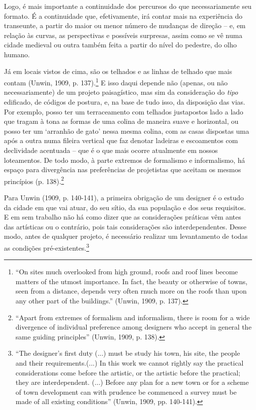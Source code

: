 \documentclass[12pt, a4paper]{book} %
\begin{document}
        Logo, é mais importante a continuidade dos percursos do que necessariamente seu formato. É a continuidade que, efetivamente, irá contar mais na experiência do transeunte, a partir do maior ou menor número de mudanças de direção – e, em relação às curvas, as perspectivas e possíveis surpresas, assim como se vê numa cidade medieval ou outra também feita a partir do nível do pedestre, do olho humano.

        Já em locais vistos de cima, são os telhados e as linhas de telhado que mais contam (Unwin, 1909, p. 137).\footnote[26]{``On sites much overlooked from high ground, roofs and roof lines become matters of the utmost importance. In fact, the beauty or otherwise of towns, seen from a distance, depends very often rnuch more on the roofs than upon any other part of the buildings.'' (Unwin, 1909, p. 137).} E isso daqui depende não (apenas, ou não necessariamente) de um projeto paisagístico, mas sim da consideração do \textit{tipo} edificado, de códigos de postura, e, na base de tudo isso, da disposição das vias. Por exemplo, posso ter um terraceamento com telhados justapostos lado a lado que tragam à tona as formas de uma colina de maneira suave e horizontal, ou posso ter um `arranhão de gato' nessa mesma colina, com as casas dispostas uma após a outra numa fileira vertical que faz denotar ladeiras e escoamentos com declividade acentuada – que é o que mais ocorre atualmente em nossos loteamentos. De todo modo, à parte extremos de formalismo e informalismo, há espaço para divergência nas preferências de projetistas que aceitam os mesmos princípios (p. 138).\footnote[27]{``Apart from extremes of formalism and informalism, there is room for a wide divergence of individual preference among designers who accept in general the same guiding principles'' (Unwin, 1909, p. 138).}

        Para Unwin (1909, p. 140-141), a primeira obrigação de um designer é o estudo da cidade em que vai atuar, do seu sítio, da sua população e dos seus requisitos. E em sem trabalho não há como dizer que as considerações práticas vêm antes das artísticas ou o contrário, pois tais considerações são interdependentes. Desse modo, antes de qualquer projeto, é necessário realizar um levantamento de todas as condições pré-existentes.\footnote[28]{``The designer's first duty (...) must be study his town, his site, the people and their requirements.(...) In this work we cannot rightly say the practical considerations come before the artistic, or the artistic before the practical; they are interdependent. (...) Before any plan for a new town or for a scheme of town development can with prudence be commenced a survey must be made of all existing conditions'' (Unwin, 1909, pp. 140-141).}
\end{document}
